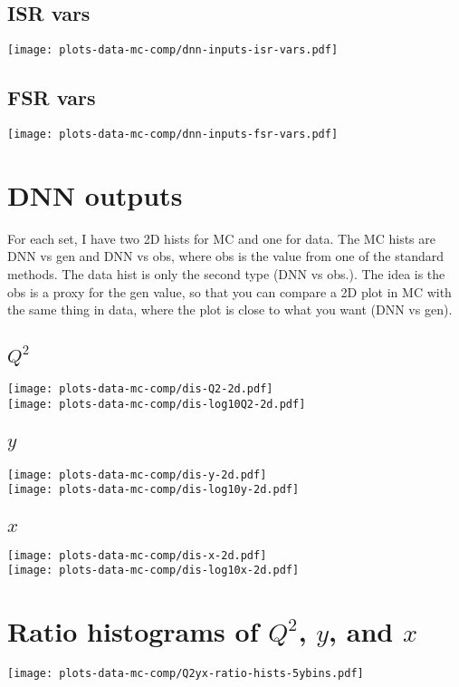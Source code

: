 \documentclass[11pt]{article}
\begin{document}
\subsection{ ISR vars }
\texttt{[image: plots-data-mc-comp/dnn-inputs-isr-vars.pdf]}

\subsection{ FSR vars }
\texttt{[image: plots-data-mc-comp/dnn-inputs-fsr-vars.pdf]}


\pagebreak

\section{ DNN outputs }

For each set, I have two 2D hists for MC and one for data.
The MC hists are DNN vs gen and DNN vs obs, where obs is
the value from one of the standard methods.  The data
hist is only the second type (DNN vs obs.).
The idea is the obs is a proxy for the gen value, so that you can
compare a 2D plot in MC with the same thing in data, where
the plot is close to what you want (DNN vs gen).

\subsection{ $Q^2$ }
\texttt{[image: plots-data-mc-comp/dis-Q2-2d.pdf]} \\
\texttt{[image: plots-data-mc-comp/dis-log10Q2-2d.pdf]}

\subsection{ $y$ }
\texttt{[image: plots-data-mc-comp/dis-y-2d.pdf]} \\
\texttt{[image: plots-data-mc-comp/dis-log10y-2d.pdf]}

\subsection{ $x$ }
\texttt{[image: plots-data-mc-comp/dis-x-2d.pdf]} \\
\texttt{[image: plots-data-mc-comp/dis-log10x-2d.pdf]}


\section{ Ratio histograms of $Q^2$, $y$, and $x$ }

\texttt{[image: plots-data-mc-comp/Q2yx-ratio-hists-5ybins.pdf]} \\
\end{document}
